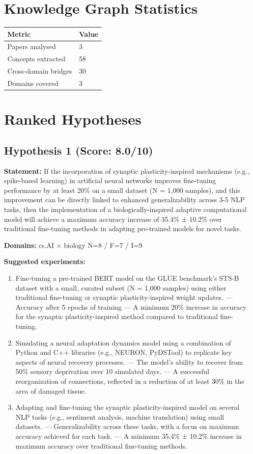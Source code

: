 \documentclass[12pt,a4paper]{article}
\begin{document}
\section{Knowledge Graph Statistics}

\begin{tabular}{ll}
\toprule
Metric & Value \\
\midrule
Papers analysed   & 3 \\
Concepts extracted & 58 \\
Cross-domain bridges & 30 \\
Domains covered   & 3 \\
\bottomrule
\end{tabular}

\section{Ranked Hypotheses}

\subsection*{Hypothesis 1 (Score: 8.0/10)}

\textbf{Statement:} If the incorporation of synaptic plasticity-inspired mechanisms (e.g., spike-based learning) in artificial neural networks improves fine-tuning performance by at least 20\% on a small dataset (N = 1,000 samples), and this improvement can be directly linked to enhanced generalizability across 3-5 NLP tasks, then the implementation of a biologically-inspired adaptive computational model will achieve a maximum accuracy increase of 35.4\% ± 10.2\% over traditional fine-tuning methods in adapting pre-trained models for novel tasks.

\noindent\textbf{Domains:} cs.AI $\times$ biology
\hspace{1em} N=8 / F=7 / I=9

\textbf{Suggested experiments:}
\begin{enumerate}
  \item Fine-tuning a pre-trained BERT model on the GLUE benchmark's STS-B dataset with a small, curated subset (N = 1,000 samples) using either traditional fine-tuning or synaptic plasticity-inspired weight updates. — Accuracy after 5 epochs of training — A minimum 20\% increase in accuracy for the synaptic plasticity-inspired method compared to traditional fine-tuning.
  \item Simulating a neural adaptation dynamics model using a combination of Python and C++ libraries (e.g., NEURON, PyDSTool) to replicate key aspects of neural recovery processes. — The model's ability to recover from 50\% sensory deprivation over 10 simulated days. — A successful reorganization of connections, reflected in a reduction of at least 30\% in the area of damaged tissue.
  \item Adapting and fine-tuning the synaptic plasticity-inspired model on several NLP tasks (e.g., sentiment analysis, machine translation) using small datasets. — Generalizability across these tasks, with a focus on maximum accuracy achieved for each task. — A minimum 35.4\% ± 10.2\% increase in maximum accuracy over traditional fine-tuning methods.
\end{enumerate}
\end{document}
